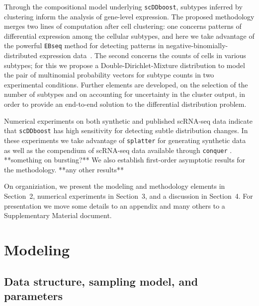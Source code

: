 \documentclass[aoas,preprint]{imsart}
\begin{document}
Through the compositional model underlying \verb+scDDboost+, subtypes inferred by clustering 
inform the analysis of gene-level expression.  The proposed methodology merges two lines of computation
after cell clustering: one concerns patterns of differential expression among 
the cellular subtypes, and here we take advantage of the powerful \verb+EBseq+ method for detecting
patterns in negative-binomially-distributed expression data~\citep{ref:Leng}.  The second concerns 
the counts of cells in various subtypes; for this we propose a Double-Dirichlet-Mixture distribution
to model the pair of multinomial probability vectors for subtype counts in two experimental conditions.
Further elements are developed, on the selection of the number of subtypes and on accounting for uncertainty in the cluster output,  in order to provide an end-to-end solution to the differential distribution
problem.  

Numerical experiments  on both synthetic and published scRNA-seq data indicate that \verb+scDDboost+ has high
sensitivity for detecting subtle distribution changes.  In these experiments we take advantage of
\verb+splatter+ for generating synthetic data~\citep{ref:Zappia} as well as the compendium of scRNA-seq
data available through \verb+conquer+ \citep{ref:Cq}.  **something on bursting?**
We also establish first-order asymptotic results for the methodology.    **any other results**

On organiziation, we present
the modeling and methodology elements in Section~2, numerical experiments in Section~3, and a discussion
in Section~4.  For presentation we move some details to an appendix and many others to a Supplementary 
Material document.



\section{Modeling}
\subsection{Data structure, sampling model, and parameters}
\end{document}
